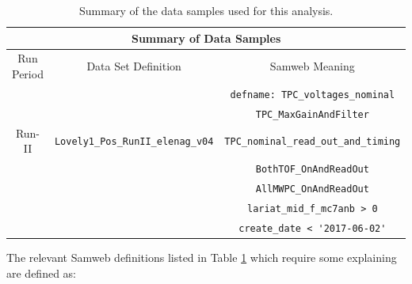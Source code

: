 \begin{center}
\begin{table}[htb]
	\begin{center}
	\begin{tabular}{|c|c|c|}
	\multicolumn{3}{c}{\textbf{Summary of Data Samples}} \\
	\hline \hline
	 Run Period & Data Set Definition & Samweb Meaning \\
     \hline	
	&  & \verb!defname: TPC_voltages_nominal! \\
	\hline
	 &  & \verb!TPC_MaxGainAndFilter! \\
	\hline
	Run-II & \verb!Lovely1_Pos_RunII_elenag_v04! & \verb!TPC_nominal_read_out_and_timing!  \\
	\hline
	 & & \verb!BothTOF_OnAndReadOut!  \\
	\hline
	 & & \verb!AllMWPC_OnAndReadOut!  \\
	 \hline
	 & & \verb!lariat_mid_f_mc7anb > 0! \\
	 	 \hline
	 & & \verb!create_date < '2017-06-02'! \\

	 \hline
	\end{tabular}%
	\caption{Summary of the data samples used for this analysis. }
	\label{tab:datasamples}
	\end{center}
\end{table}
\end{center}

The relevant Samweb definitions listed in Table \ref{tab:datasamples} which require some explaining are defined as:

